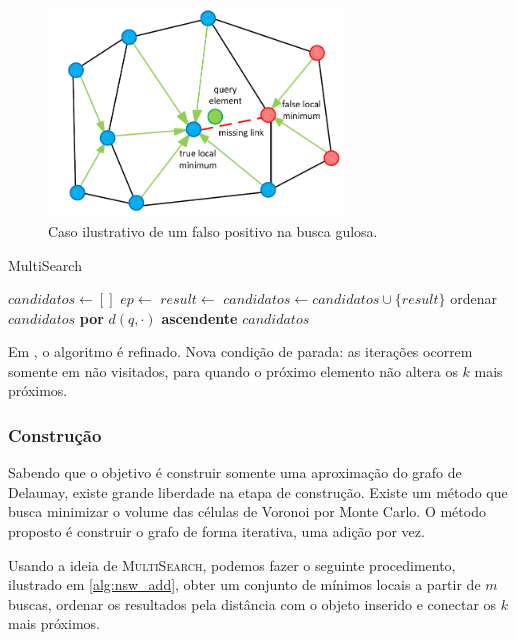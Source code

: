 \begin{figure}
    \centering
    \includegraphics[width=0.7\textwidth]{imgs/nsw_falsepositive.png}
    \caption{Caso ilustrativo de um falso positivo na busca gulosa.}
    \label{fig:nsw_falsepositive}
\end{figure}

\begin{algorithm}
\caption{MultiSearch}
\begin{algorithmic}[1]
    \State $candidatos \gets []$
        \State $ep \gets$ 
        \State $result \gets$ 
        \State $candidatos \gets candidatos \cup \{result\}$
    \EndFor
    \State ordenar $candidatos$ \textbf{por} $d(q, \cdot)$ \textbf{ascendente}
    \State \Return $candidatos$
\EndProcedure
\end{algorithmic}
\end{algorithm}

Em \cite{smallworldgraphs:malkov2014}, o algoritmo é refinado. Nova condição de parada: as iterações ocorrem somente em não visitados, para quando o próximo elemento não altera os $k$ mais próximos.

\subsubsection{Construção}

Sabendo que o objetivo é construir somente uma aproximação do grafo de Delaunay, existe grande liberdade na etapa de construção. Existe um método que busca minimizar o volume das células de Voronoi por Monte Carlo. O método proposto é construir o grafo de forma iterativa, uma adição por vez.

Usando a ideia de 
\textsc{MultiSearch}, podemos fazer o seguinte procedimento, ilustrado em \cref{alg:nsw_add}, obter um conjunto de mínimos locais a partir de $m$ buscas, ordenar os resultados pela distância com o objeto inserido e conectar os $k$ mais próximos.

